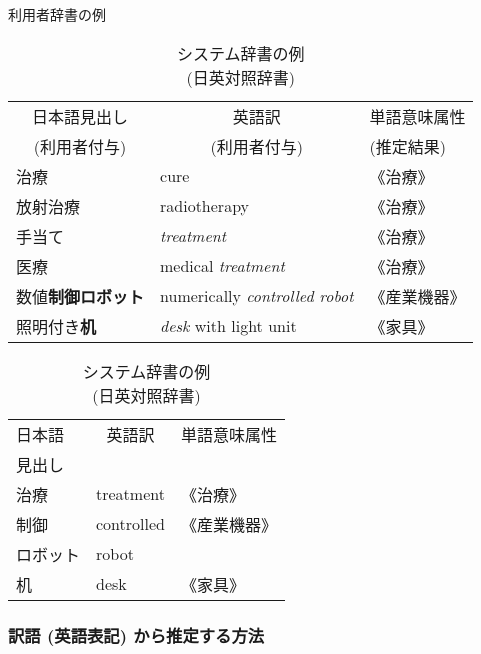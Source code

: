 \begin{table}
\hspace{-0.5cm}
  \begin{minipage}{8.8cm}
  \caption{利用者辞書の例}
  \label{tab:1}
  \begin{center}
    \leavevmode
    \begin{tabular}{|p{2.3cm}|p{2.3cm}|l|}
      \hline
      \multicolumn{1}{|c|}{日本語見出し} & \multicolumn{1}{|c|}{英語訳} & 単語意味属性 \\
      \multicolumn{1}{|c|}{ (利用者付与) } & \multicolumn{1}{|c|}{ (利用者付与) } &  (推定結果)  \\\hline
      治療 & cure & 《治療》 \\ \hline
      放射治療 & radiotherapy & 《治療》 \\ \hline
      手当て & {\it treatment\/} & 《治療》 \\ \hline
      医療 & medical {\it treatment\mbox{}\/} & 《治療》 \\ \hline
      数値\bf 制御ロボット & numerically  {\it controlled robot\/} & 《産業機器》 \\ \hline
      照明付き\bf 机 & {\it desk\/} with light unit & 《家具》 \\ \hline
    \end{tabular}
  \end{center}
  \end{minipage}
  \begin{minipage}{5.3cm}
  \caption{システム辞書の例\\ (日英対照辞書) }
  \label{tab:2}
  \begin{center}
    \leavevmode
    \begin{tabular}{|l|p{1.2cm}|l|}
      \hline
      日本語& \multicolumn{1}{|c|}{英語訳} & 単語意味属性 \\
      見出し & & \\ \hline
      治療 & treatment & 《治療》 \\ \hline
      制御 & controlled & 《産業機器》 \\ 
      ロボット & robot & \\ \hline
      机 & desk & 《家具》 \\\hline
    \end{tabular}
  \end{center}
\end{minipage}
\end{table}



\subsubsection{訳語 (英語表記) から推定する方法}


